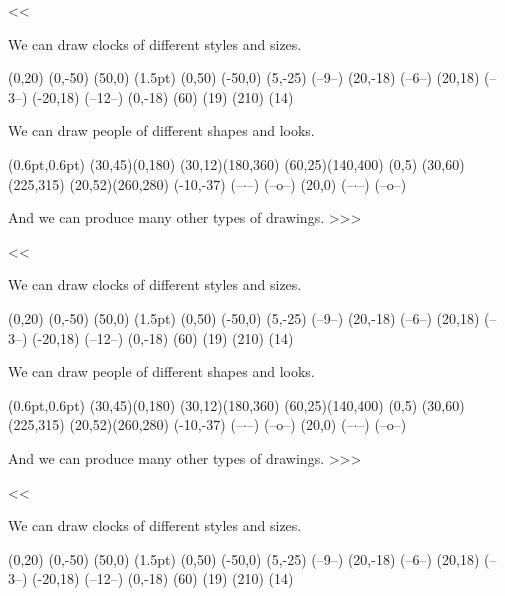 {  

\<<<
 

We can draw clocks of
different styles and sizes.

\Draw 
  \Move(0,20)     \Line(0,-50) \Line(50,0)
  \PenSize(1.5pt) \Line(0,50)  \Line(-50,0)
  \Move(5,-25)    \Text(--9--)
  \Move(20,-18)   \Text(--6--)
  \Move(20,18)    \Text(--3--)
  \Move(-20,18)   \Text(--12--)
  \Move(0,-18)    {\RotateTo(60) \LineF(19)}
  \RotateTo(210)  \LineF(14)
\EndDraw

We can draw people of 
different shapes and looks.

\Draw(0.6pt,0.6pt)
  \DrawOvalArc(30,45)(0,180) 
  \DrawOvalArc(30,12)(180,360) 
  \DrawOvalArc(60,25)(140,400)
  \Move(0,5)
  \DrawOvalArc(30,60)(225,315)
  \DrawOvalArc(20,52)(260,280)
  \Move(-10,-37) {\Text(--$\cdotp$--)}  \Text(--o--)
  \Move(20,0)    {\Text(--$\cdotp$--)}  \Text(--o--)
\EndDraw

And we can produce many other
types of drawings.       \bye>>>




\<<<
 


We can draw clocks of
different styles and sizes.

\Draw 
  \Move(0,20)     \Line(0,-50) \Line(50,0)
  \PenSize(1.5pt) \Line(0,50)  \Line(-50,0)
  \Move(5,-25)    \Text(--9--)
  \Move(20,-18)   \Text(--6--)
  \Move(20,18)    \Text(--3--)
  \Move(-20,18)   \Text(--12--)
  \Move(0,-18)    {\RotateTo(60) \LineF(19)}
  \RotateTo(210)  \LineF(14)
\EndDraw

We can draw people of 
different shapes and looks.

\Draw(0.6pt,0.6pt)
  \DrawOvalArc(30,45)(0,180) 
  \DrawOvalArc(30,12)(180,360) 
  \DrawOvalArc(60,25)(140,400)
  \Move(0,5)
  \DrawOvalArc(30,60)(225,315)
  \DrawOvalArc(20,52)(260,280)
  \Move(-10,-37) {\Text(--$\cdotp$--)}  \Text(--o--)
  \Move(20,0)    {\Text(--$\cdotp$--)}  \Text(--o--)
\EndDraw

And we can produce many other
types of drawings.       >>>


\<<<


We can draw clocks of
different styles and sizes.

\Draw 
  \Move(0,20)     \Line(0,-50) \Line(50,0)
  \PenSize(1.5pt) \Line(0,50)  \Line(-50,0)
  \Move(5,-25)    \Text(--9--)
  \Move(20,-18)   \Text(--6--)
  \Move(20,18)    \Text(--3--)
  \Move(-20,18)   \Text(--12--)
  \Move(0,-18)    {\RotateTo(60) \LineF(19)}
  \RotateTo(210)  \LineF(14)
\EndDraw

}
